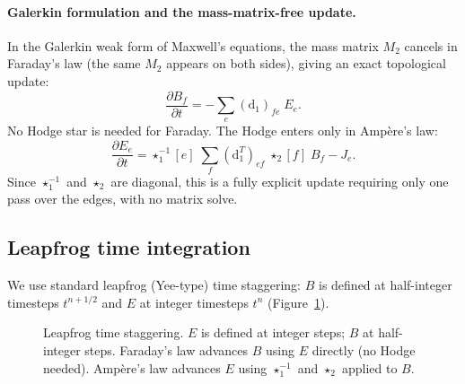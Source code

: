 \documentclass[11pt,a4paper]{article}
\newcommand{\dd}{\mathrm{d}}
\newcommand{\half}{\tfrac{1}{2}}
\newcommand{\hodge}{\star}
\begin{document}
\paragraph{Galerkin formulation and the mass-matrix-free update.}
In the Galerkin weak form of Maxwell's equations, the mass matrix $M_2$
cancels in Faraday's law (the same $M_2$ appears on both sides), giving an
exact topological update:
\begin{equation}
  \frac{\partial B_f}{\partial t} = -\sum_e (\dd_1)_{fe}\;E_e.
  \label{eq:faraday_exact}
\end{equation}
No Hodge star is needed for Faraday. The Hodge enters only in Amp\`ere's law:
\begin{equation}
  \frac{\partial E_e}{\partial t}
    = \hodge_1^{-1}[e]\;\sum_f (\dd_1^T)_{ef}\;\hodge_2[f]\;B_f - J_e.
  \label{eq:ampere_hodge}
\end{equation}
Since $\hodge_1^{-1}$ and $\hodge_2$ are diagonal, this is a fully explicit
update requiring only one pass over the edges, with no matrix solve.

\subsection{Leapfrog time integration}
\label{sec:leapfrog}

We use standard leapfrog (Yee-type) time staggering: $B$ is defined at
half-integer timesteps $t^{n+1/2}$ and $E$ at integer timesteps $t^n$
(Figure~\ref{fig:leapfrog}).

\begin{figure}[ht]
\centering
{}
\caption{Leapfrog time staggering. $E$ is defined at integer steps; $B$ at
  half-integer steps. Faraday's law advances $B$ using $E$ directly (no Hodge
  needed). Amp\`ere's law advances $E$ using $\hodge_1^{-1}$ and $\hodge_2$
  applied to $B$.}
\label{fig:leapfrog}
\end{figure}
\end{document}
